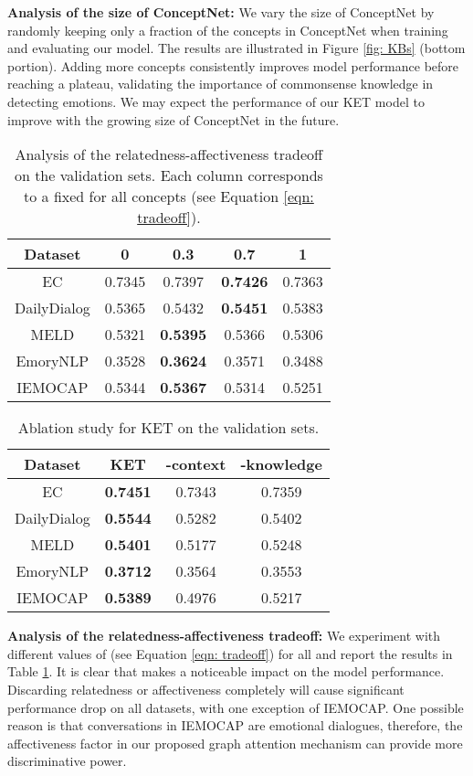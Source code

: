 \documentclass[11pt,a4paper]{article}
\begin{document}
\noindent\textbf{Analysis of the size of ConceptNet:} 
We vary the size of ConceptNet by randomly keeping only a fraction of the concepts in ConceptNet when training and evaluating our model. The results are illustrated in Figure \ref{fig: KBs} (bottom portion). Adding more concepts consistently improves model performance before reaching a plateau, validating the importance of commonsense knowledge in detecting emotions. We may expect the performance of our KET model to improve with the growing size of ConceptNet in the future.
\begin{table}[!t]
\small
\centering
\begin{tabular}{ccccc}
 \hline
 \textbf{Dataset} & \textbf{0} & \textbf{0.3} & \textbf{0.7} & \textbf{1}\\
 \hline
 EC & 0.7345 & 0.7397 & \textbf{0.7426} & 0.7363\\
 DailyDialog & 0.5365 & 0.5432 & \textbf{0.5451} & 0.5383\\
 MELD & 0.5321 & \textbf{0.5395} & 0.5366 & 0.5306\\
 EmoryNLP & 0.3528 & \textbf{0.3624} & 0.3571 & 0.3488\\
 IEMOCAP & 0.5344 & \textbf{0.5367} & 0.5314 & 0.5251\\
 \hline
\end{tabular}
\caption{Analysis of the relatedness-affectiveness tradeoff on the validation sets. Each column corresponds to a fixed  for all concepts (see Equation \ref{eqn: tradeoff}).}
\label{table: relatedness-affectiveness tradeoff}
\end{table}
\begin{table}[!t]
\small
\centering
\begin{tabular}{cccc}
 \hline
 \textbf{Dataset} & KET & -context & -knowledge\\
 \hline
 EC & \textbf{0.7451} & 0.7343 & 0.7359\\
 DailyDialog & \textbf{0.5544} & 0.5282 & 0.5402\\
 MELD & \textbf{0.5401} & 0.5177 & 0.5248\\
 EmoryNLP & \textbf{0.3712} & 0.3564 & 0.3553\\
 IEMOCAP & \textbf{0.5389} & 0.4976 & 0.5217\\
 \hline
\end{tabular}
\caption{Ablation study for KET on the validation sets.}
\label{table: ablation study}
\end{table}

\noindent\textbf{Analysis of the relatedness-affectiveness tradeoff:}
\label{sec: tradeoff}
We experiment with different values of  (see Equation \ref{eqn: tradeoff}) for all  and report the results in Table \ref{table: relatedness-affectiveness tradeoff}. It is clear that  makes a noticeable impact on the model performance. Discarding relatedness or affectiveness completely will cause significant performance drop on all datasets, with one exception of IEMOCAP. One possible reason is that conversations in IEMOCAP are emotional dialogues, therefore, the affectiveness factor in our proposed graph attention mechanism can provide more discriminative power.
\end{document}
